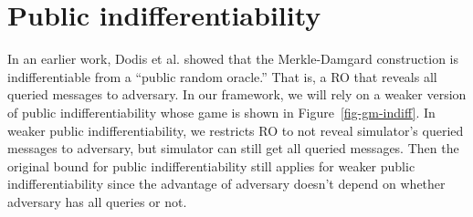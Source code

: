 \section{Public indifferentiability}\label{sec-pub} 
In an earlier work, Dodis et al. showed that the Merkle-Damgard construction is indifferentiable from a ``public random oracle.'' That is, a RO that reveals all queried messages to adversary.
In our framework, we will rely on a weaker version of public indifferentiability whose game is shown in Figure~\ref{fig-gm-indiff}. In weaker public indifferentiability, we restricts RO to not reveal simulator's queried messages to adversary, but simulator can still get all queried messages. Then the original bound for public indifferentiability still applies for weaker public indifferentiability since the advantage of adversary doesn't depend on whether adversary has all queries or not.
		

